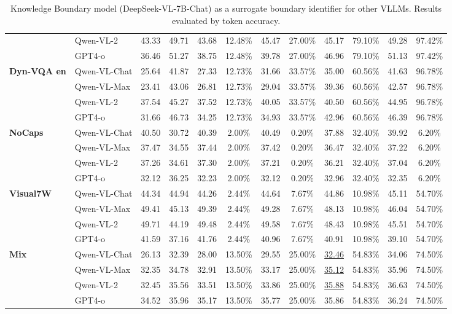 \begin{table*}[t]
{\begin{tabular}{llcccccccc|cc}
 & Qwen-VL-2 & 43.33 & 49.71 & 43.68 & 12.48\% & 45.47 & 27.00\% & 45.17 & 79.10\% & 49.28 & 97.42\% \\
 & GPT4-o & 36.46 & 51.27 & 38.75 & 12.48\% & 39.78 & 27.00\% & 46.96 & 79.10\% & 51.13 & 97.42\% \\ 
\midrule
\multirow{4}{*}{\textbf{Dyn-VQA en}} & Qwen-VL-Chat & 25.64 & 41.87 & 27.33 & 12.73\% & 31.66 & 33.57\% & 35.00 & 60.56\% & 41.63 & 96.78\% \\
 & Qwen-VL-Max & 23.41 & 43.06 & 26.81 & 12.73\% & 29.04 & 33.57\% & 39.36 & 60.56\% & 42.57 & 96.78\% \\
 & Qwen-VL-2 & 37.54 & 45.27 & 37.52 & 12.73\% & 40.05 & 33.57\% & 40.50 & 60.56\% & 44.95 & 96.78\% \\
 & GPT4-o & 31.66 & 46.73 & 34.25 & 12.73\% & 34.93 & 33.57\% & 42.96 & 60.56\% & 46.39 & 96.78\% \\ 
\midrule
\multirow{4}{*}{\textbf{NoCaps}} & Qwen-VL-Chat & 40.50 & 30.72 & 40.39 & 2.00\% & 40.49 & 0.20\% & 37.88 & 32.40\% & 39.92 & 6.20\% \\
 & Qwen-VL-Max & 37.47 & 34.55 & 37.44 & 2.00\% & 37.42 & 0.20\% & 36.47 & 32.40\% & 37.22 & 6.20\% \\
 & Qwen-VL-2 & 37.26 & 34.61 & 37.30 & 2.00\% & 37.21 & 0.20\% & 36.21 & 32.40\% & 37.04 & 6.20\% \\
 & GPT4-o & 32.12 & 36.25 & 32.23 & 2.00\% & 32.12 & 0.20\% & 32.96 & 32.40\% & 32.35 & 6.20\% \\ 
\midrule
\multirow{4}{*}{\textbf{Visual7W}} & Qwen-VL-Chat & 44.34 & 44.94 & 44.26 & 2.44\% & 44.64 & 7.67\% & 44.86 & 10.98\% & 45.11 & 54.70\% \\
 & Qwen-VL-Max & 49.41 & 45.13 & 49.39 & 2.44\% & 49.28 & 7.67\% & 48.13 & 10.98\% & 46.04 & 54.70\% \\
 & Qwen-VL-2 & 49.71 & 44.19 & 49.48 & 2.44\% & 49.58 & 7.67\% & 48.43 & 10.98\% & 45.51 & 54.70\% \\
 & GPT4-o & 41.59 & 37.16 & 41.76 & 2.44\% & 40.96 & 7.67\% & 40.91 & 10.98\% & 39.10 & 54.70\% \\ 
\midrule
\midrule
\multirow{4}{*}{\textbf{Mix}} & Qwen-VL-Chat & 26.13 & 32.39 & 28.00 & 13.50\% & 29.55 & 25.00\% & \uline{32.46} & 54.83\% & 34.06 & 74.50\% \\
 & Qwen-VL-Max & 32.35 & 34.78 & 32.91 & 13.50\% & 33.17 & 25.00\% & \uline{35.12} & 54.83\% & 35.96 & 74.50\% \\
 & Qwen-VL-2 & 32.45 & 35.56 & 33.51 & 13.50\% & 33.86 & 25.00\% & \uline{35.88} & 54.83\% & 36.63 & 74.50\% \\
 & GPT4-o & 34.52 & 35.96 & 35.17 & 13.50\% & 35.77 & 25.00\% & 35.86 & 54.83\% & 36.24 & 74.50\% \\
\bottomrule
\end{tabular}
}
\caption{Knowledge Boundary model (DeepSeek-VL-7B-Chat) as a surrogate boundary identifier for other VLLMs. Results evaluated by token accuracy.}
\label{main_results_ds_acc_table}
\end{table*}



